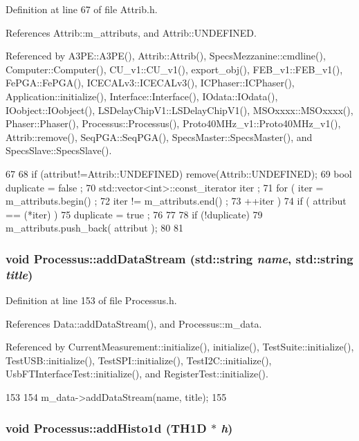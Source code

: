 Definition at line 67 of file Attrib.h.

References Attrib::m\_\-attributs, and Attrib::UNDEFINED.

Referenced by A3PE::A3PE(), Attrib::Attrib(), SpecsMezzanine::cmdline(), Computer::Computer(), CU\_\-v1::CU\_\-v1(), export\_\-obj(), FEB\_\-v1::FEB\_\-v1(), FePGA::FePGA(), ICECALv3::ICECALv3(), ICPhaser::ICPhaser(), Application::initialize(), Interface::Interface(), IOdata::IOdata(), IOobject::IOobject(), LSDelayChipV1::LSDelayChipV1(), MSOxxxx::MSOxxxx(), Phaser::Phaser(), Processus::Processus(), Proto40MHz\_\-v1::Proto40MHz\_\-v1(), Attrib::remove(), SeqPGA::SeqPGA(), SpecsMaster::SpecsMaster(), and SpecsSlave::SpecsSlave().


\begin{DoxyCode}
67                             {
68     if (attribut!=Attrib::UNDEFINED) remove(Attrib::UNDEFINED);
69     bool duplicate = false ;
70     std::vector<int>::const_iterator iter ;
71     for ( iter  = m_attributs.begin() ;
72           iter != m_attributs.end()   ;
73           ++iter ) {
74       if ( attribut == (*iter) ) {
75         duplicate = true ;
76       }
77     }
78     if (!duplicate) {
79       m_attributs.push_back( attribut );
80     }
81   }
\end{DoxyCode}
\hypertarget{classProcessus_a308c8f193802f1d1ab49d4447d0cb281}{
\subsubsection[{addDataStream}]{\setlength{\rightskip}{0pt plus 5cm}void Processus::addDataStream (std::string {\em name}, \/  std::string {\em title})}}
\label{classProcessus_a308c8f193802f1d1ab49d4447d0cb281}


Definition at line 153 of file Processus.h.

References Data::addDataStream(), and Processus::m\_\-data.

Referenced by CurrentMeasurement::initialize(), initialize(), TestSuite::initialize(), TestUSB::initialize(), TestSPI::initialize(), TestI2C::initialize(), UsbFTInterfaceTest::initialize(), and RegisterTest::initialize().


\begin{DoxyCode}
153                                                        {
154     m_data->addDataStream(name, title);
155   }
\end{DoxyCode}
\hypertarget{classProcessus_ad46e0d4dfdfdcbce001ee6be1746dfa4}{
\subsubsection[{addHisto1d}]{\setlength{\rightskip}{0pt plus 5cm}void Processus::addHisto1d (TH1D $\ast$ {\em h})}}
\label{classProcessus_ad46e0d4dfdfdcbce001ee6be1746dfa4}


